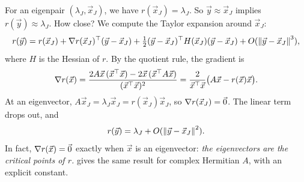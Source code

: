 For an eigenpair $(\lambda_J, \vec{x}_J)$, we have $r(\vec{x}_J) = \lambda_J$. So $\vec{y} \approx \vec{x}_J$ implies $r(\vec{y}) \approx \lambda_J$. How close? We compute the Taylor expansion around $\vec{x}_J$:
\begin{equation}
  r(\vec{y}) = r(\vec{x}_J) + \nabla r(\vec{x}_J)^\top(\vec{y} - \vec{x}_J) + \tfrac{1}{2}(\vec{y} - \vec{x}_J)^\top H(\vec{x}_J)(\vec{y} - \vec{x}_J) + O(\left\lVert \vec{y} - \vec{x}_J \right\rVert^3),
\end{equation}
where $H$ is the Hessian of $r$. By the quotient rule, the gradient is
\begin{equation}
  \nabla r(\vec{x}) = \frac{2A\vec{x}\,(\vec{x}^\top\vec{x}) - 2\vec{x}\,(\vec{x}^\top A\vec{x})}{(\vec{x}^\top\vec{x})^2} = \frac{2}{\vec{x}^\top\vec{x}}\bigl(A\vec{x} - r(\vec{x})\vec{x}\bigr).
\end{equation}
At an eigenvector, $A\vec{x}_J = \lambda_J\vec{x}_J = r(\vec{x}_J)\vec{x}_J$, so $\nabla r(\vec{x}_J) = \vec{0}$. The linear term drops out, and
\begin{equation}
  r(\vec{y}) = \lambda_J + O(\left\lVert \vec{y} - \vec{x}_J \right\rVert^2).
\end{equation}
In fact, $\nabla r(\vec{x}) = \vec{0}$ exactly when $\vec{x}$ is an eigenvector: \emph{the eigenvectors are the critical points of $r$.}  gives the same result for complex Hermitian $A$, with an explicit constant.

